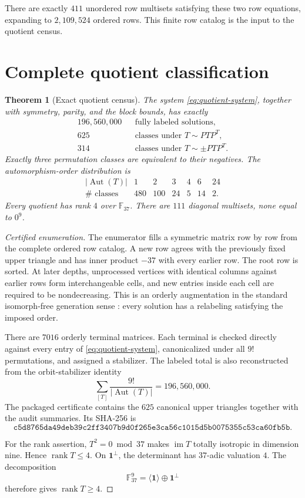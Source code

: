\documentclass[11pt]{article}
\newtheorem{theorem}{Theorem}[section]
\theoremstyle{definition}
\newcommand{\F}{\mathbb{F}}
\newcommand{\rank}{\operatorname{rank}}
\newcommand{\im}{\operatorname{im}}
\newcommand{\Aut}{\operatorname{Aut}}
\newcommand{\one}{\mathbf{1}}
\begin{document}
There are exactly \(411\) unordered row multisets satisfying these two
row equations, expanding to \(2{,}109{,}524\) ordered rows.  This finite
row catalog is the input to the quotient census.

\section{Complete quotient classification}
\label{sec:quotients}

\begin{theorem}[Exact quotient census]
\label{thm:quotient-census}
The system \eqref{eq:quotient-system}, together with symmetry, parity, and
the block bounds, has exactly
\[
\begin{array}{rcl}
196{,}560{,}000&&\text{fully labeled solutions},\\
625&&\text{classes under }T\sim PTP^T,\\
314&&\text{classes under }T\sim\pm PTP^T.
\end{array}
\]
Exactly three permutation classes are equivalent to their negatives.
The automorphism-order distribution is
\[
\begin{array}{c|rrrrrr}
|\Aut(T)|&1&2&3&4&6&24\\ \hline
\#\text{ classes}&480&100&24&5&14&2.
\end{array}
\]
Every quotient has rank \(4\) over \(\F_{37}\).  There are \(111\)
diagonal multisets, none equal to \(0^9\).
\end{theorem}

\begin{proof}[Certified enumeration]
The enumerator fills a symmetric matrix row by row from the complete
ordered row catalog.  A new row agrees with the previously fixed upper
triangle and has inner product \(-37\) with every earlier row.  The root
row is sorted.  At later depths, unprocessed vertices with identical
columns against earlier rows form interchangeable cells, and new entries
inside each cell are required to be nondecreasing.  This is an orderly
augmentation in the standard isomorph-free generation sense
\cite{mckay}: every solution has a relabeling satisfying the imposed
order.

There are \(7016\) orderly terminal matrices.  Each terminal is checked
directly against every entry of \eqref{eq:quotient-system}, canonicalized
under all \(9!\) permutations, and assigned a stabilizer.  The labeled
total is also reconstructed from the orbit-stabilizer identity
\[
 \sum_{[T]}\frac{9!}{|\Aut(T)|}=196{,}560{,}000.
\]
The packaged certificate
 contains the \(625\)
canonical upper triangles together with the audit summaries.  Its
SHA-256 is
\[
\texttt{c5d8765da49deb39c2ff3407b9d0f265e3ca56c1015d5b0075355c53ca60fb5b}.
\]

For the rank assertion, \(T^2=0\bmod37\) makes \(\im T\) totally
isotropic in dimension nine.  Hence \(\rank T\leq4\).  On
\(\one^\perp\), the determinant has \(37\)-adic valuation \(4\).  The
decomposition
\[
\F_{37}^9=\langle\one\rangle\oplus\one^\perp
\]
therefore gives \(\rank T\geq4\).
\end{proof}
\end{document}
